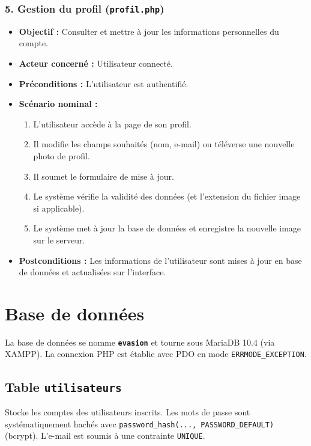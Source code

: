 \documentclass[a4paper,12pt]{article}
\begin{document}
\subsubsection*{5. Gestion du profil (\texttt{profil.php})}
\begin{itemize}[label=\textbullet]
    \item \textbf{Objectif :} Consulter et mettre à jour les informations personnelles du compte.
    \item \textbf{Acteur concerné :} Utilisateur connecté.
    \item \textbf{Préconditions :} L'utilisateur est authentifié.
    \item \textbf{Scénario nominal :}
    \begin{enumerate}[label=\arabic*.]
        \item L'utilisateur accède à la page de son profil.
        \item Il modifie les champs souhaités (nom, e-mail) ou téléverse une nouvelle photo de profil.
        \item Il soumet le formulaire de mise à jour.
        \item Le système vérifie la validité des données (et l'extension du fichier image si applicable).
        \item Le système met à jour la base de données et enregistre la nouvelle image sur le serveur.
    \end{enumerate}
    \item \textbf{Postconditions :} Les informations de l'utilisateur sont mises à jour en base de données et actualisées sur l'interface.
\end{itemize}
\section{Base de données}

La base de données se nomme \textbf{\texttt{evasion}} et tourne sous MariaDB 10.4 (via XAMPP). La connexion PHP est établie avec PDO en mode \texttt{ERRMODE\_EXCEPTION}.

\subsection{Table \texttt{utilisateurs}}

Stocke les comptes des utilisateurs inscrits. Les mots de passe sont systématiquement hachés avec \texttt{password\_hash(..., PASSWORD\_DEFAULT)} (bcrypt). L'e-mail est soumis à une contrainte \texttt{UNIQUE}.
\end{document}

